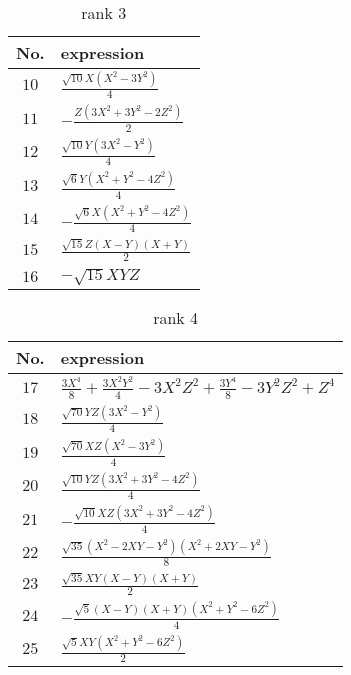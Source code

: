 \documentclass[fleqn,8pt,landscape]{jsarticle}
\begin{document}
\begin{table}[ht!]
\begin{center}
\caption{rank 3}
\renewcommand{\arraystretch}{1.3}
\begin{tabular}{cl} \hline \hline
No. & expression \\ \hline
$ 10 $ & $ \frac{\sqrt{10} X \left(X^{2} - 3 Y^{2}\right)}{4} $ \\
$ 11 $ & $ - \frac{Z \left(3 X^{2} + 3 Y^{2} - 2 Z^{2}\right)}{2} $ \\
$ 12 $ & $ \frac{\sqrt{10} Y \left(3 X^{2} - Y^{2}\right)}{4} $ \\
$ 13 $ & $ \frac{\sqrt{6} Y \left(X^{2} + Y^{2} - 4 Z^{2}\right)}{4} $ \\
$ 14 $ & $ - \frac{\sqrt{6} X \left(X^{2} + Y^{2} - 4 Z^{2}\right)}{4} $ \\
$ 15 $ & $ \frac{\sqrt{15} Z \left(X - Y\right) \left(X + Y\right)}{2} $ \\
$ 16 $ & $ - \sqrt{15} X Y Z $ \\
 \hline \hline
\end{tabular}
\end{center}
\end{table}
\begin{table}[ht!]
\begin{center}
\caption{rank 4}
\renewcommand{\arraystretch}{1.3}
\begin{tabular}{cl} \hline \hline
No. & expression \\ \hline
$ 17 $ & $ \frac{3 X^{4}}{8} + \frac{3 X^{2} Y^{2}}{4} - 3 X^{2} Z^{2} + \frac{3 Y^{4}}{8} - 3 Y^{2} Z^{2} + Z^{4} $ \\
$ 18 $ & $ \frac{\sqrt{70} Y Z \left(3 X^{2} - Y^{2}\right)}{4} $ \\
$ 19 $ & $ \frac{\sqrt{70} X Z \left(X^{2} - 3 Y^{2}\right)}{4} $ \\
$ 20 $ & $ \frac{\sqrt{10} Y Z \left(3 X^{2} + 3 Y^{2} - 4 Z^{2}\right)}{4} $ \\
$ 21 $ & $ - \frac{\sqrt{10} X Z \left(3 X^{2} + 3 Y^{2} - 4 Z^{2}\right)}{4} $ \\
$ 22 $ & $ \frac{\sqrt{35} \left(X^{2} - 2 X Y - Y^{2}\right) \left(X^{2} + 2 X Y - Y^{2}\right)}{8} $ \\
$ 23 $ & $ \frac{\sqrt{35} X Y \left(X - Y\right) \left(X + Y\right)}{2} $ \\
$ 24 $ & $ - \frac{\sqrt{5} \left(X - Y\right) \left(X + Y\right) \left(X^{2} + Y^{2} - 6 Z^{2}\right)}{4} $ \\
$ 25 $ & $ \frac{\sqrt{5} X Y \left(X^{2} + Y^{2} - 6 Z^{2}\right)}{2} $ \\
 \hline \hline
\end{tabular}
\end{center}
\end{table}
\end{document}
